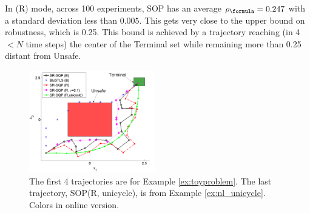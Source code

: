 \begin{exmp}
In (R) mode, across 100 experiments, SOP has an average $\rob_{\formula}=0.247$ with a standard deviation less than $0.005$. 
This gets very close to the upper bound on robustness, which is 0.25.
This bound is achieved by a trajectory reaching (in 4$<N$ time steps) the center of the Terminal set while remaining more than 0.25 distant from Unsafe. 
\end{exmp}

\begin{figure}[t]
\centering
\includegraphics[width=0.49\textwidth]{figures/ToyExUni_alternate_scissored.pdf}
\vspace{-20pt}
\caption{{\small The first 4 trajectories are for Example \ref{ex:toyproblem}. The last trajectory, SOP(R, unicycle), is from Example \ref{ex:nl_unicycle}. Colors in online version.}}
\label{fig:toy control}
\vspace{-10pt}
\end{figure}


